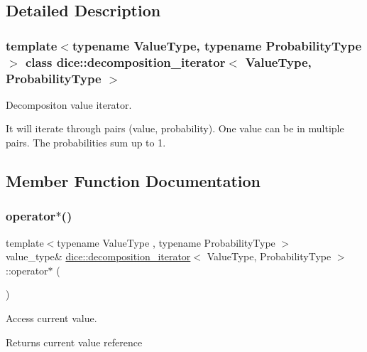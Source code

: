 \subsection{Detailed Description}
\subsubsection*{template$<$typename Value\+Type, typename Probability\+Type$>$\newline
class dice\+::decomposition\+\_\+iterator$<$ Value\+Type, Probability\+Type $>$}

Decompositon value iterator. 

It will iterate through pairs (value, probability). One value can be in multiple pairs. The probabilities sum up to 1. 

\subsection{Member Function Documentation}
\mbox{\label{classdice_1_1decomposition__iterator_a77865c81e7e643f634c41a0cb0ae55fb}} 
\subsubsection{\texorpdfstring{operator$\ast$()}{operator*()}}
{\footnotesize\ttfamily template$<$typename Value\+Type , typename Probability\+Type $>$ \\
value\+\_\+type\& \mbox{\hyperlink{classdice_1_1decomposition__iterator}{dice\+::decomposition\+\_\+iterator}}$<$ Value\+Type, Probability\+Type $>$\+::operator$\ast$ (\begin{DoxyParamCaption}{ }\end{DoxyParamCaption})\hspace{0.3cm}{\ttfamily [inline]}}



Access current value. 

\begin{DoxyReturn}{Returns}
current value reference 
\end{DoxyReturn}
\mbox{\label{classdice_1_1decomposition__iterator_afdd9eb500d48653f709548f7ae34bf2f}} 
